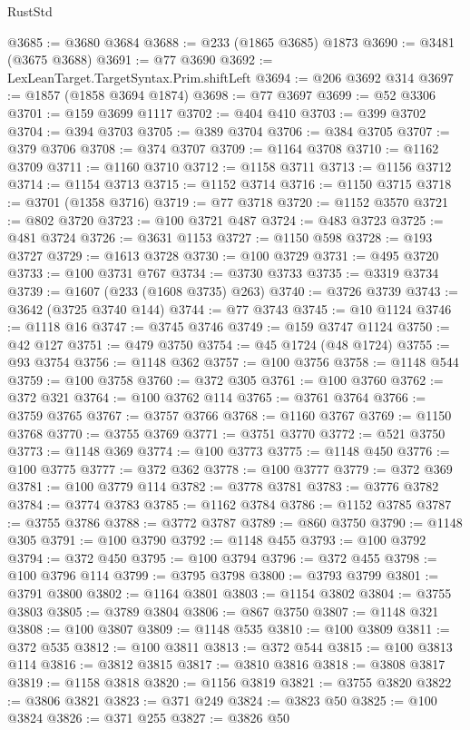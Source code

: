 \begin{lexlean}{RustStd}
\begin{coremodule}
@3685 := @3680 @3684
@3688 := @233 (@1865 @3685) @1873
@3690 := @3481 (@3675 @3688)
@3691 := @77 @3690
@3692 := LexLeanTarget.TargetSyntax.Prim.shiftLeft
@3694 := @206 @3692 @314
@3697 := @1857 (@1858 @3694 @1874)
@3698 := @77 @3697
@3699 := @52 @3306
@3701 := @159 @3699 @1117
@3702 := @404 @410
@3703 := @399 @3702
@3704 := @394 @3703
@3705 := @389 @3704
@3706 := @384 @3705
@3707 := @379 @3706
@3708 := @374 @3707
@3709 := @1164 @3708
@3710 := @1162 @3709
@3711 := @1160 @3710
@3712 := @1158 @3711
@3713 := @1156 @3712
@3714 := @1154 @3713
@3715 := @1152 @3714
@3716 := @1150 @3715
@3718 := @3701 (@1358 @3716)
@3719 := @77 @3718
@3720 := @1152 @3570
@3721 := @802 @3720
@3723 := @100 @3721 @487
@3724 := @483 @3723
@3725 := @481 @3724
@3726 := @3631 @1153
@3727 := @1150 @598
@3728 := @193 @3727
@3729 := @1613 @3728
@3730 := @100 @3729
@3731 := @495 @3720
@3733 := @100 @3731 @767
@3734 := @3730 @3733
@3735 := @3319 @3734
@3739 := @1607 (@233 (@1608 @3735) @263)
@3740 := @3726 @3739
@3743 := @3642 (@3725 @3740 @144)
@3744 := @77 @3743
@3745 := @10 @1124
@3746 := @1118 @16
@3747 := @3745 @3746
@3749 := @159 @3747 @1124
@3750 := @42 @127
@3751 := @479 @3750
@3754 := @45 @1724 (@48 @1724)
@3755 := @93 @3754
@3756 := @1148 @362
@3757 := @100 @3756
@3758 := @1148 @544
@3759 := @100 @3758
@3760 := @372 @305
@3761 := @100 @3760
@3762 := @372 @321
@3764 := @100 @3762 @114
@3765 := @3761 @3764
@3766 := @3759 @3765
@3767 := @3757 @3766
@3768 := @1160 @3767
@3769 := @1150 @3768
@3770 := @3755 @3769
@3771 := @3751 @3770
@3772 := @521 @3750
@3773 := @1148 @369
@3774 := @100 @3773
@3775 := @1148 @450
@3776 := @100 @3775
@3777 := @372 @362
@3778 := @100 @3777
@3779 := @372 @369
@3781 := @100 @3779 @114
@3782 := @3778 @3781
@3783 := @3776 @3782
@3784 := @3774 @3783
@3785 := @1162 @3784
@3786 := @1152 @3785
@3787 := @3755 @3786
@3788 := @3772 @3787
@3789 := @860 @3750
@3790 := @1148 @305
@3791 := @100 @3790
@3792 := @1148 @455
@3793 := @100 @3792
@3794 := @372 @450
@3795 := @100 @3794
@3796 := @372 @455
@3798 := @100 @3796 @114
@3799 := @3795 @3798
@3800 := @3793 @3799
@3801 := @3791 @3800
@3802 := @1164 @3801
@3803 := @1154 @3802
@3804 := @3755 @3803
@3805 := @3789 @3804
@3806 := @867 @3750
@3807 := @1148 @321
@3808 := @100 @3807
@3809 := @1148 @535
@3810 := @100 @3809
@3811 := @372 @535
@3812 := @100 @3811
@3813 := @372 @544
@3815 := @100 @3813 @114
@3816 := @3812 @3815
@3817 := @3810 @3816
@3818 := @3808 @3817
@3819 := @1158 @3818
@3820 := @1156 @3819
@3821 := @3755 @3820
@3822 := @3806 @3821
@3823 := @371 @249
@3824 := @3823 @50
@3825 := @100 @3824
@3826 := @371 @255
@3827 := @3826 @50

\end{coremodule}
\end{lexlean}
